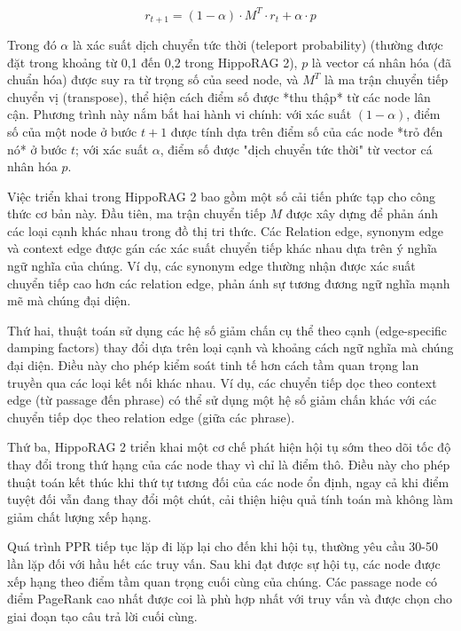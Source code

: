 \documentclass[../main.tex]{subfiles}
\begin{document}
\begin{equation}
r_{t+1} = (1-\alpha) \cdot M^T \cdot r_t + \alpha \cdot p \label{eq:ppr_update}
\end{equation}

Trong đó $\alpha$ là xác suất dịch chuyển tức thời (teleport probability) (thường được đặt trong khoảng từ 0,1 đến 0,2 trong HippoRAG 2), $p$ là vector cá nhân hóa (đã chuẩn hóa) được suy ra từ trọng số của seed node, và $M^T$ là ma trận chuyển tiếp chuyển vị (transpose), thể hiện cách điểm số được *thu thập* từ các node lân cận. Phương trình này nắm bắt hai hành vi chính: với xác suất $(1-\alpha)$, điểm số của một node ở bước $t+1$ được tính dựa trên điểm số của các node *trỏ đến nó* ở bước $t$; với xác suất $\alpha$, điểm số được "dịch chuyển tức thời" từ vector cá nhân hóa $p$.

Việc triển khai trong HippoRAG 2 bao gồm một số cải tiến phức tạp cho công thức cơ bản này. Đầu tiên, ma trận chuyển tiếp $M$ được xây dựng để phản ánh các loại cạnh khác nhau trong đồ thị tri thức. Các Relation edge, synonym edge và context edge được gán các xác suất chuyển tiếp khác nhau dựa trên ý nghĩa ngữ nghĩa của chúng. Ví dụ, các synonym edge thường nhận được xác suất chuyển tiếp cao hơn các relation edge, phản ánh sự tương đương ngữ nghĩa mạnh mẽ mà chúng đại diện.

Thứ hai, thuật toán sử dụng các hệ số giảm chấn cụ thể theo cạnh (edge-specific damping factors) thay đổi dựa trên loại cạnh và khoảng cách ngữ nghĩa mà chúng đại diện. Điều này cho phép kiểm soát tinh tế hơn cách tầm quan trọng lan truyền qua các loại kết nối khác nhau. Ví dụ, các chuyển tiếp dọc theo context edge (từ passage đến phrase) có thể sử dụng một hệ số giảm chấn khác với các chuyển tiếp dọc theo relation edge (giữa các phrase).

Thứ ba, HippoRAG 2 triển khai một cơ chế phát hiện hội tụ sớm theo dõi tốc độ thay đổi trong thứ hạng của các node thay vì chỉ là điểm thô. Điều này cho phép thuật toán kết thúc khi thứ tự tương đối của các node ổn định, ngay cả khi điểm tuyệt đối vẫn đang thay đổi một chút, cải thiện hiệu quả tính toán mà không làm giảm chất lượng xếp hạng.

Quá trình PPR tiếp tục lặp đi lặp lại cho đến khi hội tụ, thường yêu cầu 30-50 lần lặp đối với hầu hết các truy vấn. Sau khi đạt được sự hội tụ, các node được xếp hạng theo điểm tầm quan trọng cuối cùng của chúng. Các passage node có điểm PageRank cao nhất được coi là phù hợp nhất với truy vấn và được chọn cho giai đoạn tạo câu trả lời cuối cùng.
\end{document}
